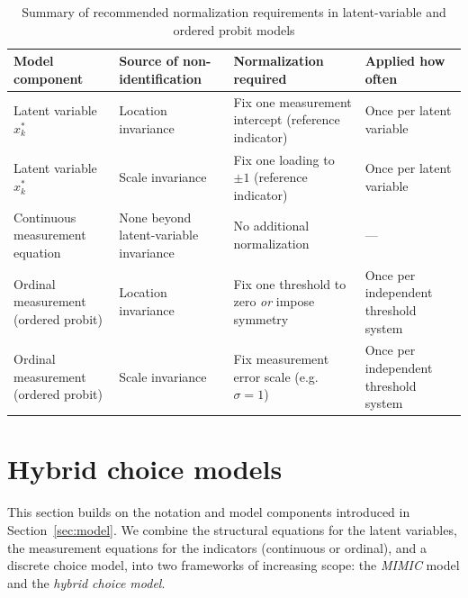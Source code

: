 \documentclass[12pt,a4paper]{article}
\begin{document}
\begin{table}
\centering
\caption{Summary of recommended normalization requirements in latent-variable and
  ordered probit models}
\label{tab:normalization_summary}
\renewcommand{\arraystretch}{1.3}
\begin{tabular}{R{4.5cm} R{5.0cm} R{6.0cm} R{4.5cm}}
\hline \textbf{Model component} & \textbf{Source of
  non-identification} & \textbf{Normalization required} &
\textbf{Applied how often} \\ \hline

Latent variable $x_k^*$ & Location invariance & Fix one measurement
intercept (reference indicator) & Once per latent variable \\

Latent variable $x_k^*$ & Scale invariance & Fix one loading to $\pm
1$ (reference indicator) & Once per latent variable \\

\hline

Continuous measurement equation & None beyond latent-variable
invariance & No additional normalization & --- \\

\hline

Ordinal measurement (ordered probit) & Location invariance &
Fix one threshold to zero \emph{or} impose symmetry & Once per
independent threshold system \\

Ordinal measurement (ordered probit) & Scale invariance &
Fix measurement error scale (e.g.\ $\sigma=1$) & Once per independent
threshold system \\


\hline
\end{tabular}
\end{table}
\section{Hybrid choice models}
\label{sec:hcm}

This section builds on the notation and model components introduced in
Section~\ref{sec:model}. We combine the structural equations for the
latent variables, the measurement equations for the indicators
(continuous or ordinal), and a discrete choice model, into two
frameworks of increasing scope: the \emph{MIMIC} model and the
\emph{hybrid choice model}.
\end{document}
